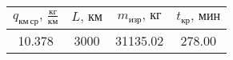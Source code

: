 \begin{tabular}{|c|c|c|c|}
\hline
$q_{км\, ср},\, \frac{кг}{км}$ & $L,\, км$ & $m_{изр},\, кг$ & $t_{кр},\, мин$ \\ 
\hline
10.378 & 3000 & 31135.02 & 278.00 \\ 
\hline
\end{tabular}